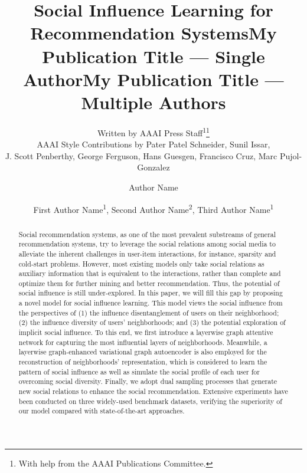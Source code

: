 \documentclass[letterpaper]{article} %
\title{Social Influence Learning for Recommendation Systems}
\author{
    Written by AAAI Press Staff\textsuperscript{\rm 1}\thanks{With help from the AAAI Publications Committee.}\\
    AAAI Style Contributions by Pater Patel Schneider,
    Sunil Issar,\\
    J. Scott Penberthy,
    George Ferguson,
    Hans Guesgen,
    Francisco Cruz\equalcontrib,
    Marc Pujol-Gonzalez\equalcontrib
}
\title{My Publication Title --- Single Author}
\author {
    Author Name
}
\title{My Publication Title --- Multiple Authors}
\author {
    First Author Name\textsuperscript{\rm 1},
    Second Author Name\textsuperscript{\rm 2},
    Third Author Name\textsuperscript{\rm 1}
}
\begin{document}
\maketitle

\begin{abstract}
Social recommendation systems, as one of the most prevalent substreams of general recommendation systems, try to leverage the social relations among social media to alleviate the inherent challenges in user-item interactions, for instance, sparsity and cold-start problems. However, most existing models only take social relations as auxiliary information that is equivalent to the interactions, rather than complete and optimize them for further mining and better recommendation. Thus, the potential of social influence is still under-explored. In this paper, we will fill this gap by proposing a novel model for social influence learning. This model views the social influence from the perspectives of (1) the influence disentanglement of users on their neighborhood; (2) the influence diversity of users' neighborhoods; and (3) the potential exploration of implicit social influence. To this end, we first introduce a layerwise graph attentive network for capturing the most influential layers of neighborhoods. Meanwhile, a layerwise graph-enhanced variational graph autoencoder is also employed for the reconstruction of neighborhoods' representation, which is considered to learn the pattern of social influence as well as simulate the social profile of each user for overcoming social diversity. Finally, we adopt dual sampling processes that generate new social relations to enhance the social recommendation. Extensive experiments have been conducted on three widely-used benchmark datasets, verifying the superiority of our model compared with state-of-the-art approaches.
\end{abstract}
\end{document}
